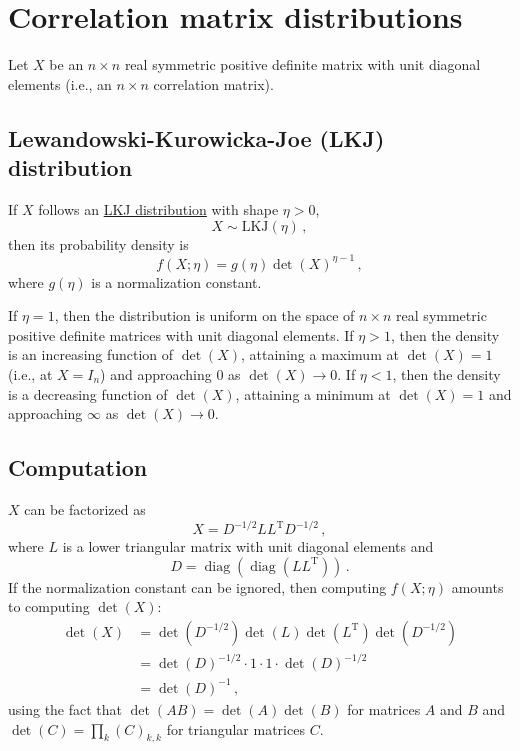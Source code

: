 \documentclass[12pt]{article}
\DeclareMathOperator{\diag}{diag}
\newcommand{\transpose}[1]{#1^{\mathrm{T}}}
\begin{document}
\setlength{\parskip}{5mm}
\setlength{\parindent}{0mm}

\section{Correlation matrix distributions}

Let $X$ be an $n \times n$ real symmetric positive definite matrix
with unit diagonal elements (i.e., an $n \times n$ correlation matrix).

\subsection{Lewandowski-Kurowicka-Joe (LKJ) distribution}

If $X$ follows an
\href{https://mc-stan.org/docs/2_27/functions-reference/lkj-correlation.html}{LKJ distribution}
with shape $\eta > 0$,
\begin{equation}
X \sim \mathrm{LKJ}(\eta)\,,
\end{equation}
then its probability density is
\begin{equation}
f(X;\eta) = g(\eta) \det(X)^{\eta - 1}\,,
\end{equation}
where $g(\eta)$ is a normalization constant.

If $\eta = 1$, then the distribution is uniform on the space of
$n \times n$ real symmetric positive definite matrices with unit
diagonal elements.
%
If $\eta > 1$, then the density is an increasing function of $\det(X)$,
attaining a maximum at $\det(X) = 1$ (i.e., at $X = I_n$)
and approaching $0$ as $\det(X) \to 0$.
%
If $\eta < 1$, then the density is a decreasing function of $\det(X)$,
attaining a minimum at $\det(X) = 1$
and approaching $\infty$ as $\det(X) \to 0$.

\subsection{Computation}

$X$ can be factorized as
\begin{equation}
X = D^{-1/2} L \transpose{L} D^{-1/2}\,,
\end{equation}
where $L$ is a lower triangular matrix with unit diagonal elements
and
\begin{equation}
D = \diag(\diag(L \transpose{L}))\,.
\end{equation}
If the normalization constant can be ignored,
then computing $f(X;\eta)$ amounts to computing $\det(X)$:
\begin{equation}
\begin{aligned}
\det(X)
  &= \det(D^{-1/2}) \det(L) \det(\transpose{L}) \det(D^{-1/2}) \\
  &= \det(D)^{-1/2} \cdot 1 \cdot 1 \cdot \det(D)^{-1/2} \\
  &= \det(D)^{-1}\,,
\end{aligned}
\end{equation}
using the fact that
$\det(A B) = \det(A) \det(B)$ for matrices $A$ and $B$
and
$\det(C) = \prod_{k} (C)_{k,k}$ for triangular matrices $C$.
\end{document}
